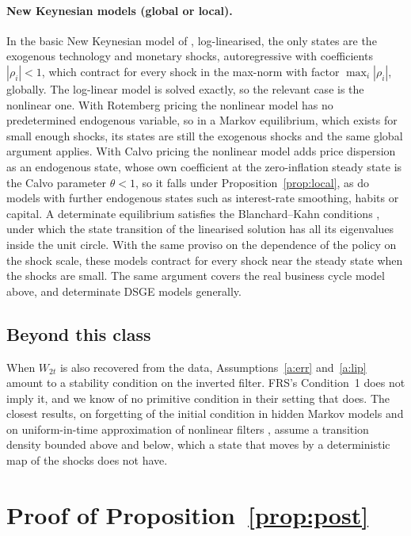 \documentclass[11pt]{article}
\theoremstyle{definition}
\theoremstyle{remark}
\begin{document}
\paragraph{New Keynesian models (global or local).} In the basic New Keynesian model of
\citet[Ch.~3]{Gali2015}, log-linearised, the only states are the exogenous technology and
monetary shocks, autoregressive with coefficients $|\rho_i| < 1$, which contract for every shock
in the max-norm with factor $\max_i|\rho_i|$, globally. The log-linear model is solved exactly, so
the relevant case is the nonlinear one. With Rotemberg pricing the nonlinear model has no
predetermined endogenous variable, so in a Markov equilibrium, which exists for small enough
shocks, its states are still the exogenous shocks and the same global argument applies. With Calvo pricing the nonlinear model adds price
dispersion as an endogenous state, whose own coefficient at the zero-inflation steady state is
the Calvo parameter $\theta < 1$, so it falls under Proposition~\ref{prop:local}, as do models with
further endogenous states such as interest-rate smoothing, habits or capital. A determinate
equilibrium satisfies the Blanchard--Kahn conditions \citep{BlanchardKahn1980}, under which the state transition
of the linearised solution has all its eigenvalues inside the unit circle. With the same proviso
on the dependence of the policy on the shock scale, these models contract for every shock near
the steady state when the shocks are small. The same argument covers the real business cycle
model above, and determinate DSGE models generally.

\subsection{Beyond this class}

When $W_{2t}$ is also recovered from the data, Assumptions~\ref{a:err} and~\ref{a:lip} amount to a
stability condition on the inverted filter. FRS's Condition~1 does not imply it, and we know of no
primitive condition in their setting that does. The closest results, on forgetting of the initial
condition in hidden Markov models \citep{BickelRitovRyden1998,DoucMoulinesRyden2004} and on
uniform-in-time approximation of nonlinear filters \citep{LeGlandOudjane2004}, assume a transition
density bounded above and below, which a state that moves by a deterministic map of the shocks
does not have.

\section{Proof of Proposition~\ref{prop:post}}\label{app:post}
\end{document}
